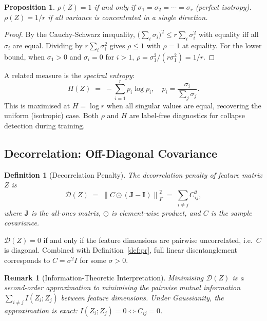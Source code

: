 \documentclass[11pt,a4paper]{article}
\newtheorem{proposition}[theorem]{Proposition}
\newtheorem{definition}[theorem]{Definition}
\newtheorem{remark}[theorem]{Remark}
\newcommand{\norm}[1]{\left\|#1\right\|}
\begin{document}
\begin{proposition}
$\rho(Z) = 1$ if and only if $\sigma_1 = \sigma_2 = \cdots = \sigma_r$
(perfect isotropy). $\rho(Z) = 1/r$ if all variance is concentrated in a single
direction.
\end{proposition}
\begin{proof}
By the Cauchy-Schwarz inequality,
$\bigl(\sum_i \sigma_i\bigr)^2 \le r \sum_i \sigma_i^2$
with equality iff all $\sigma_i$ are equal.
Dividing by $r \sum_i \sigma_i^2$ gives $\rho \le 1$ with $\rho = 1$ at equality.
For the lower bound, when $\sigma_1 > 0$ and $\sigma_i = 0$ for $i > 1$,
$\rho = \sigma_1^2 / (r \sigma_1^2) = 1/r$.
\end{proof}

A related measure is the \emph{spectral entropy}:
\[
    H(Z) \;=\; -\sum_{i=1}^r p_i \log p_i, \quad
    p_i = \frac{\sigma_i}{\sum_j \sigma_j}.
\]
This is maximised at $H = \log r$ when all singular values are equal, recovering
the uniform (isotropic) case.  Both $\rho$ and $H$ are label-free diagnostics
for collapse detection during training.

\subsection{Decorrelation: Off-Diagonal Covariance}
\label{sec:decorrelation}

\begin{definition}[Decorrelation Penalty]
\label{def:decor}
The \emph{decorrelation penalty} of feature matrix $Z$ is
\[
    \mathcal{D}(Z)
    \;=\; \norm{C \odot (\bm{J} - \bm{I})}_F^2
    \;=\; \sum_{i \ne j} C_{ij}^2,
\]
where $\bm{J}$ is the all-ones matrix, $\odot$ is element-wise product, and
$C$ is the sample covariance.
\end{definition}

$\mathcal{D}(Z) = 0$ if and only if the feature dimensions are pairwise
uncorrelated, i.e.\ $C$ is diagonal.  Combined with Definition~\ref{def:pr},
full linear disentanglement corresponds to $C = \sigma^2 I$ for some
$\sigma > 0$.

\begin{remark}[Information-Theoretic Interpretation]
Minimising $\mathcal{D}(Z)$ is a second-order approximation to minimising the
pairwise mutual information $\sum_{i \ne j} I(Z_i; Z_j)$ between feature
dimensions.  Under Gaussianity, the approximation is exact: $I(Z_i; Z_j) = 0
\Leftrightarrow C_{ij} = 0$.
\end{remark}
\end{document}
